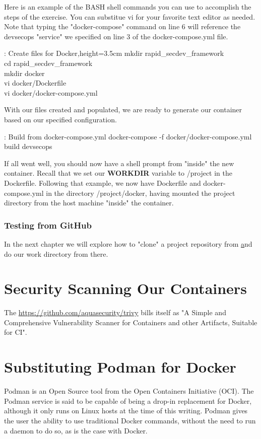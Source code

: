 \justify
Here is an example of the BASH shell commands you can use to accomplish
the steps of the exercise. You can substitue vi for your favorite text
editor as needed. Note that typing the "docker-compose" command on line
6 will reference the devsecops "service" we specified on line 3 of the
docker-compose.yml file.

\justify
\begin{mybox}{\thetcbcounter: Create files for Docker,height=3.5cm}
  mkdir rapid\_secdev\_framework\\
  cd rapid\_secdev\_framework\\
  mkdir docker\\
  vi docker/Dockerfile\\
  vi docker/docker-compose.yml
\end{mybox}

\justify
With our files created and populated, we are ready to generate our
container based on our specified configuration.

\begin{mybox}{\thetcbcounter: Build from docker-compose.yml }
  docker-compose -f docker/docker-compose.yml build devsecops
\end{mybox}

\justify
If all went well, you should now have a shell prompt from "inside" the
new container. Recall that we set our \textbf{WORKDIR} variable to /project in the Dockerfile. Following that example, we now have Dockerfile and docker-compose.yml in the directory /project/docker, having mounted the project directory from the host machine "inside" the container.

\subsubsection{Testing from GitHub}
\justify
In the next chapter
we will explore how to "clone" a project repository from 
\href{github.com} and
do our work directory from there.

\section{Security Scanning Our Containers}
The \href{trivy container scanner}{https://github.com/aquasecurity/trivy} bills itself as "A Simple and
Comprehensive Vulnerability Scanner for Containers and other
Artifacts, Suitable for CI".

\section{Substituting Podman for Docker}
\justify
Podman is an Open Source tool from the Open
Containers Initiative (OCI). The Podman service is said to be capable
of being a drop-in replacement for Docker, although it only
runs on Linux hosts at the time of this writing. Podman gives
the user the ability to use traditional Docker commands,
without the need to run a daemon to do so\cite{podman}, as is
the case with Docker.

